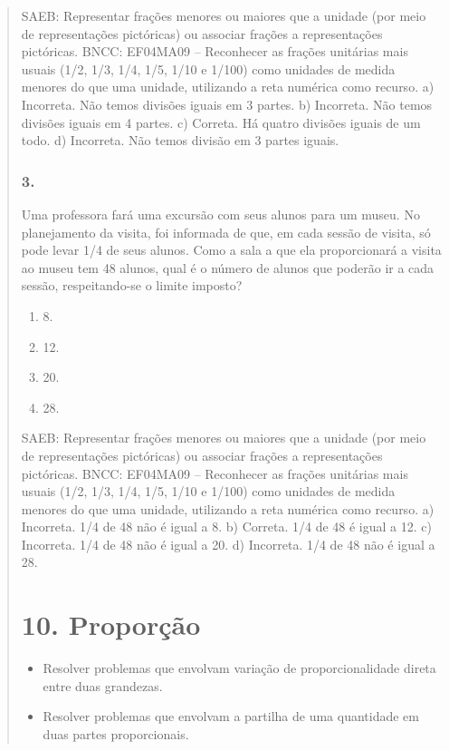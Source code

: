 \begin{enumerate}
\begin{escolha}
\begin{enumerate}
\begin{itemize}
\begin{itemize}
\begin{escolha}
\begin{quote}
\begin{escolha}
{SAEB: Representar frações menores ou maiores que a unidade (por meio de representações
pictóricas) ou associar frações a representações pictóricas.
BNCC: EF04MA09 -- Reconhecer as frações unitárias mais usuais (1/2, 1/3, 1/4, 1/5, 1/10 e 1/100) como
unidades de medida menores do que uma unidade, utilizando a reta numérica como recurso.
a)  Incorreta. Não temos divisões iguais em 3 partes.
b)  Incorreta. Não temos divisões iguais em 4 partes.
c)  Correta. Há quatro divisões iguais de um todo.
d)  Incorreta. Não temos divisão em 3 partes iguais.


\subsubsection{3.}\label{section-116}

Uma professora fará uma excursão com seus alunos para um museu. No
planejamento da visita, foi informada de que, em cada sessão de visita, só
pode levar 1/4 de seus alunos. Como a sala a que ela proporcionará a
visita ao museu tem 48 alunos, qual é o número de alunos que poderão ir a
cada sessão, respeitando-se o limite imposto?

\begin{enumerate}
\def\labelenumi{\alph{enumi})}
\item
  8.
\item
  12.
\item
  20.
\item
  28.
\end{enumerate}

SAEB: Representar frações menores ou maiores que a unidade (por meio de representações
pictóricas) ou associar frações a representações pictóricas.
BNCC: EF04MA09 -- Reconhecer as frações unitárias mais usuais (1/2, 1/3, 1/4, 1/5, 1/10 e 1/100) como
unidades de medida menores do que uma unidade, utilizando a reta numérica como recurso.
a)  Incorreta. 1/4 de 48 não é igual a 8.
b)  Correta. 1/4 de 48 é igual a 12.
c)  Incorreta. 1/4 de 48 não é igual a 20.
d)  Incorreta. 1/4 de 48 não é igual a 28.

\section{10. Proporção}\label{muxf3dulo-10}


\begin{itemize}
\item Resolver problemas que envolvam variação de proporcionalidade direta
entre duas grandezas.
\item Resolver problemas que envolvam a partilha de uma quantidade em duas
partes proporcionais.
\end{itemize}

}
\end{escolha}
\end{quote}
\end{escolha}
\end{itemize}
\end{itemize}
\end{enumerate}
\end{escolha}
\end{enumerate}
